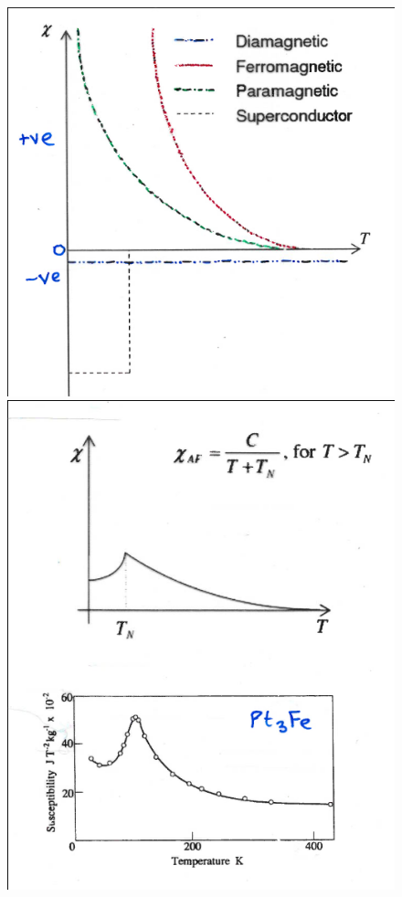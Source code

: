 \documentclass[a4paper, 11pt, normalem]{report}
\begin{document}
\begin{figure}[H]
    \centering
    \includegraphics[scale=0.4]{dia.png}
    \includegraphics[scale=0.35]{anti.png}
\end{figure}
\end{document}
